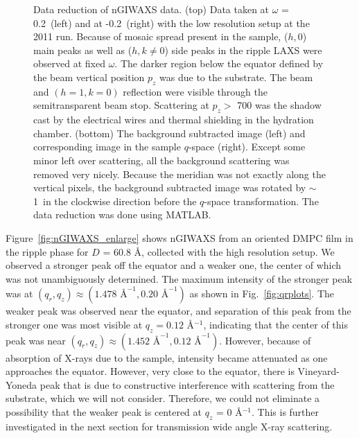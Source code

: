 \begin{figure}[htbp]
  \caption[Transformation of wide angle scattering data from the CCD to $q$-space]
  {Data reduction of nGIWAXS data. (top) Data taken at $\omega$ = 0.2\textdegree\ 
  (left) and at -0.2\textdegree\ (right) with the low resolution setup at the 
  2011 run. Because of mosaic spread present in 
  the sample, ($h,0$) main peaks as well as ($h,k\neq 0$) side peaks in the ripple LAXS 
  were observed at fixed $\omega$. The darker region below the equator defined by 
  the beam vertical position $p_z$ was due to the substrate. The beam and 
  $(h=1,k=0)$ reflection were visible through the semitransparent beam stop.
  Scattering at $p_z >$ 700 was the shadow cast by the electrical wires and thermal shielding
  in the hydration chamber.
  (bottom) The background subtracted 
  image (left) and corresponding image in the sample $q$-space (right).
  Except some minor left over scattering, all the background scattering was 
  removed very nicely. Because the meridian was not exactly along the vertical
  pixels, the background subtracted image was rotated by $\sim$1\textdegree\
  in the clockwise direction before the $q$-space transformation. The data
  reduction was done using MATLAB.}
  \label{fig:waxs_data_reduction}
\end{figure}

Figure~\ref{fig:nGIWAXS_enlarge} shows nGIWAXS from an oriented DMPC film
in the ripple phase for $D$ = 60.8 \AA, collected with the high resolution setup. 
We observed a stronger peak off the 
equator and a weaker one, the center of which was not unambiguously determined. 
The maximum intensity of the stronger peak was at 
$(q_r, q_z) \approx (1.478 \text{ \AA}^{-1}, 0.20 \text{ \AA}^{-1})$ as shown
in Fig.~\ref{fig:qrplots}. The weaker peak was observed near the equator, and
separation of this peak from the stronger one was most visible at 
$q_z = 0.12$ \AA$^{-1}$, indicating that the center of this peak was near
$(q_r, q_z) \approx (1.452 \text{ \AA}^{-1}, 0.12 \text{ \AA}^{-1})$. 
However, because of absorption
of X-rays due to the sample, intensity became attenuated as one approaches
the equator. However, very close to the equator, there is Vineyard-Yoneda 
peak that is due to constructive interference with scattering from the substrate,
which we will not consider.
Therefore, we could not eliminate a possibility that the weaker peak
is centered at $q_z$ = 0 \AA$^{-1}$. This is further investigated in
the next section for transmission wide angle X-ray scattering.

